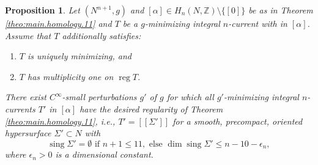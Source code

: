 \documentclass[11pt, letterpaper, reqno]{amsart}
\numberwithin{equation}{section}
\newtheorem{Prop}[Def]{Proposition}
\theoremstyle{remark}
\newcommand{\ZZ}{\mathbb{Z}}
\newcommand{\reg}{\operatorname{reg}}
\newcommand{\sing}{\operatorname{sing}}
\newcommand{\llbracket}{[\![}
\newcommand{\rrbracket}{]\!]}
\begin{document}
\begin{Prop} \label{prop:homology.min}
	Let $(N^{n+1}, g)$ and $[\alpha] \in H_n(N, \ZZ) \setminus \{ [0] \}$ be as in Theorem \ref{theo:main.homology.11} and $T$ be a $g$-minimizing integral $n$-current with in $[\alpha]$. Assume that $T$ additionally satisfies:
	\begin{enumerate}
		\item[(1)] $T$ is uniquely minimizing, and
		\item[(2)] $T$ has multiplicity one on $\reg T$.
	\end{enumerate}
	There exist $C^\infty$-small perturbations $g'$ of $g$ for which all $g'$-minimizing integral $n$-currents $T'$ in $[\alpha]$ have the desired regularity of Theorem \ref{theo:main.homology.11}, i.e., $T' = \llbracket \Sigma' \rrbracket$ for a smooth, precompact, oriented hypersurface $\Sigma' \subset N$ with 
	\[ \sing \Sigma' = \emptyset \text{ if } n+1 \leq 11, \text{ else } \dim \sing \Sigma' \leq n-10-\epsilon_n, \]
	where $\epsilon_n > 0$ is a dimensional constant.
\end{Prop}
\end{document}
